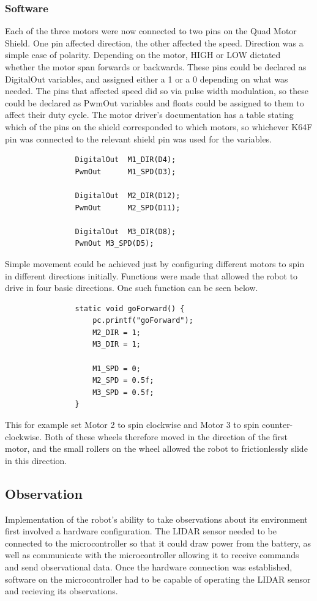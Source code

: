 				
				
				
				\subsubsection{Software}
				Each of the three motors were now connected to two pins on the Quad Motor Shield. One pin affected direction, the other affected the speed. Direction was a simple case of polarity. Depending on the motor, HIGH or LOW dictated whether the motor span forwards or backwards. These pins could be declared as DigitalOut variables, and assigned either a 1 or a 0 depending on what was needed.  The pins that affected speed did so via pulse width modulation, so these could be declared as PwmOut variables and floats could be assigned to them to affect their duty cycle. The motor driver's documentation has a table stating which of the pins on the shield corresponded to which motors, so whichever K64F pin was connected to the relevant shield pin was used for the variables.
				
				\begin{lstlisting}
				DigitalOut  M1_DIR(D4);
				PwmOut      M1_SPD(D3);
				
				DigitalOut  M2_DIR(D12);
				PwmOut      M2_SPD(D11);
				
				DigitalOut  M3_DIR(D8);
				PwmOut M3_SPD(D5);
				\end{lstlisting}
				
				Simple movement could be achieved just by configuring different motors to spin in different directions initially. Functions were made that allowed the robot to drive in four basic directions. One such function can be seen below.
				\begin{lstlisting}
				static void goForward() {
					pc.printf("goForward");
					M2_DIR = 1;
					M3_DIR = 1;
				
					M1_SPD = 0;
					M2_SPD = 0.5f;
					M3_SPD = 0.5f;
				}
				\end{lstlisting}
				
				This for example set Motor 2 to spin clockwise and Motor 3 to spin counter-clockwise. Both of these wheels therefore moved in the direction of the first motor, and the small rollers on the wheel allowed the robot to frictionlessly slide in this direction.
				
				
			\subsection{Observation}
			Implementation of the robot's ability to take observations about its environment first involved a hardware configuration. The LIDAR sensor needed to be connected to the microcontroller so that it could draw power from the battery, as well as communicate with the microcontroller allowing it to receive commands and send observational data. Once the hardware connection was established, software on the microcontroller had to be capable of operating the LIDAR sensor and recieving its observations.
